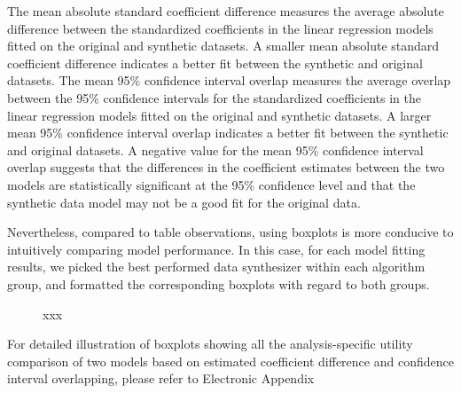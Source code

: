 The mean absolute standard coefficient difference measures the average absolute difference between the standardized coefficients in the linear regression models fitted on the original and synthetic datasets. A smaller mean absolute standard coefficient difference indicates a better fit between the synthetic and original datasets. The mean 95\% confidence interval overlap measures the average overlap between the 95\% confidence intervals for the standardized coefficients in the linear regression models fitted on the original and synthetic datasets. A larger mean 95\% confidence interval overlap indicates a better fit between the synthetic and original datasets. A negative value for the mean 95\% confidence interval overlap suggests that the differences in the coefficient estimates between the two models are statistically significant at the 95\% confidence level and that the synthetic data model may not be a good fit for the original data.

Nevertheless, compared to table observations, using boxplots is more conducive to intuitively comparing model performance. In this case, for each model fitting results, we picked the best performed data synthesizer within each algorithm group, and formatted the corresponding boxplots with regard to both groups. 
\begin{figure*}
  \centering
  \subfigure[a]{%
    \texttt{[image: ]}%
    \label{fig:a}%
    }\hspace{0.2cm}%
  \caption{xxx}
  \label{fig:ab}
\end{figure*}


For detailed illustration of boxplots showing all the analysis-specific utility comparison of two models based on estimated coefficient difference and confidence interval overlapping, please refer to Electronic Appendix


